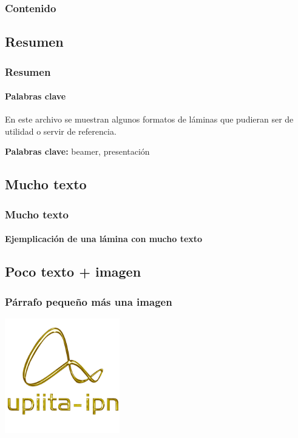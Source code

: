 	\begin{frame}
		\thispagestyle{empty} %
		\titlepage %
	\end{frame}
	\begin{frame}
		\frametitle{Contenido} %
		\tableofcontents 
	\end{frame}
	\begin{frame}
		\section{Resumen}
		\frametitle{Resumen} 
		\framesubtitle{Palabras clave}
		\label{Resumen}
		
		En este archivo se muestran algunos formatos de láminas que pudieran ser de utilidad o servir de referencia.
		
		\vspace{5mm}
		
		\label{Keywords}
		\textbf{{\large Palabras clave:}} beamer, presentación
	\end{frame}
	\begin{frame}
		\section{Mucho texto}
		\frametitle{Mucho texto}
		\framesubtitle{Ejemplicación de una lámina con mucho texto}
		\lipsum[1]
	\end{frame}
	\begin{frame}
		\section{Poco texto + imagen}
		\frametitle{Párrafo pequeño más una imagen}
		\lipsum[2][1-5]
		
		\begin{center}
			\includegraphics[height=50mm]{images/logo_upiita_oro}
		\end{center}
	\end{frame}
